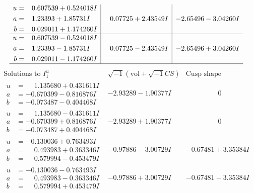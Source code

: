 \documentclass[1p]{elsarticle_modified}
\theoremstyle{definition}
\newcommand{\I}{\sqrt{-1}}
\begin{document}
$$\begin{array}{c|c|c}
\begin{aligned}
u &= \phantom{-}0.607539 + 0.524018 I \\
a &= \phantom{-}1.23393 + 1.85731 I \\
b &= \phantom{-}0.029011 + 1.174260 I\end{aligned}
 & \phantom{-}0.07725 + 2.43549 I & -2.65496 - 3.04260 I \\ \hline\begin{aligned}
u &= \phantom{-}0.607539 - 0.524018 I \\
a &= \phantom{-}1.23393 - 1.85731 I \\
b &= \phantom{-}0.029011 - 1.174260 I\end{aligned}
 & \phantom{-}0.07725 - 2.43549 I & -2.65496 + 3.04260 I\\
 \hline 
 \end{array}$$\newpage$$\begin{array}{c|c|c}  
\text{Solutions to }I^u_{1}& \I (\text{vol} + \sqrt{-1}CS) & \text{Cusp shape}\\
 \hline 
\begin{aligned}
u &= \phantom{-}1.135680 + 0.431611 I \\
a &= -0.670399 - 0.816876 I \\
b &= -0.073487 - 0.404468 I\end{aligned}
 & -2.93289 - 1.90377 I & \phantom{-0.000000 } 0 \\ \hline\begin{aligned}
u &= \phantom{-}1.135680 - 0.431611 I \\
a &= -0.670399 + 0.816876 I \\
b &= -0.073487 + 0.404468 I\end{aligned}
 & -2.93289 + 1.90377 I & \phantom{-0.000000 } 0 \\ \hline\begin{aligned}
u &= -0.130036 + 0.763493 I \\
a &= \phantom{-}0.493983 + 0.363346 I \\
b &= \phantom{-}0.579994 - 0.453479 I\end{aligned}
 & -0.97886 - 3.00729 I & -0.67481 + 3.35384 I \\ \hline\begin{aligned}
u &= -0.130036 - 0.763493 I \\
a &= \phantom{-}0.493983 - 0.363346 I \\
b &= \phantom{-}0.579994 + 0.453479 I\end{aligned}
 & -0.97886 + 3.00729 I & -0.67481 - 3.35384 I \\ \hline\begin{aligned}

\end{aligned}
\end{array}$$
\end{document}
